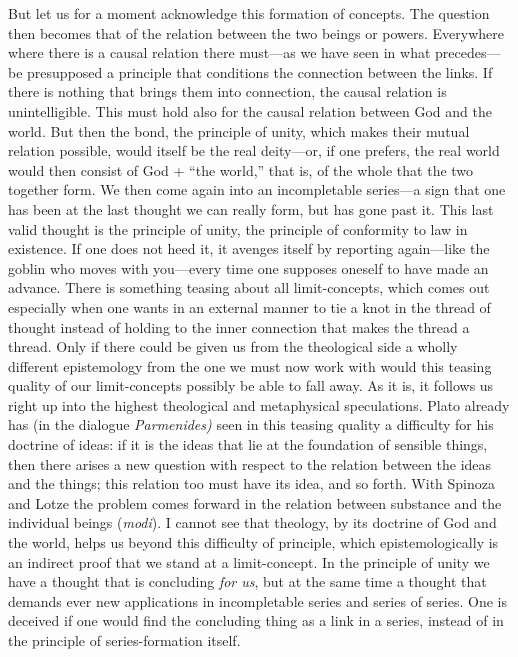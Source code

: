 \documentclass[12pt,a4paper]{book}
\newcommand{\opage}[1]{\marginnote{\footnotesize\textit{[#1]}}}
\begin{document}
But let us for a moment acknowledge this formation of concepts. The question
then becomes that of the relation between the two beings or powers. Everywhere
where there is a causal relation there must---as we have seen in what
precedes---be presupposed a principle that conditions the connection between
the links. If there is nothing that brings them into connection, the causal
relation is unintelligible. This must hold also for the causal relation
between God and the world. But then the bond, the principle of unity, which
makes their mutual relation possible, would itself be the real deity---or, if
one prefers, the real world would then consist of God + ``the world,'' that is,
of the whole that the two together form. We then come again into an
incompletable series---a sign that one has been at the last thought we can
really form, but has gone past it. This last valid thought is the principle of
unity, the principle of conformity to law in existence. If one does not heed
it, it avenges itself by reporting again---like the goblin who moves with
you---every time one supposes oneself to have made an advance. There is
something teasing about all limit-concepts, which comes out especially when
one wants in an external manner to tie a knot in the thread of thought instead
of holding to the inner connection that makes the thread a thread. Only if
there could be given us from the theological side a wholly different
epistemology from the one we must now work with would this teasing quality of
our limit-concepts possibly be able to fall away. As it is, it follows us right
up into the highest theological and metaphysical speculations. Plato already
has (in the dialogue \emph{Parmenides)} seen in this teasing quality a
difficulty for his doctrine of ideas: if it is the ideas that lie at the
foundation of sensible things, then there arises a new question with respect
to the relation between the ideas and the things; this relation too must have
its idea, and so forth. With Spinoza and Lotze the problem comes forward in
the relation between substance and the individual beings (\textit{modi}). I
cannot see that theology, by its doctrine of God and the world, helps us
beyond this difficulty of principle, which epistemologically is an indirect
proof that we stand at a limit-concept. In the principle of unity we have a
thought that is concluding \emph{for us}, but at the same time a thought that
demands ever new applications in incompletable series and series of series.
One is deceived if one 
\opage{38}would find the concluding thing as a link in a series,
instead of in the principle of series-formation itself.
\end{document}
